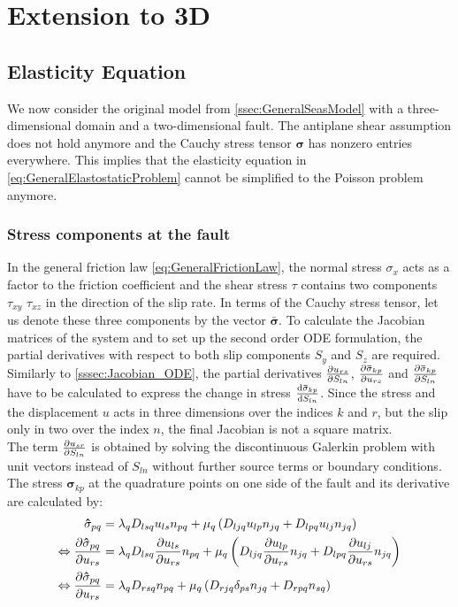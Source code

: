 \chapter{Extension to 3D}
\section{Elasticity Equation}
We now consider the original model from \autoref{ssec:GeneralSeasModel} with a three-dimensional domain and a two-dimensional fault. The antiplane shear assumption does not hold anymore and the Cauchy stress tensor $\mathbf{\sigma}$ has nonzero entries everywhere. This implies that the elasticity equation in \autoref{eq:GeneralElastostaticProblem} cannot be simplified to the Poisson problem anymore. \\

\subsection{Stress components at the fault}
In the general friction law \ref{eq:GeneralFrictionLaw}, the normal stress $\sigma_x$ acts as a factor to the friction coefficient and the shear stress $\tau$ contains two components $\tau_{xy}$ $\tau_{xz}$ in the direction of the slip rate. In terms of the Cauchy stress tensor, let us denote these three components by the vector $\mathbf{\bar{\sigma}}$. To calculate the Jacobian matrices of the system and to set up the second order ODE formulation, the partial derivatives with respect to both slip components $S_y$ and $S_z$ are required. Similarly to \autoref{sssec:Jacobian_ODE}, the partial derivatives $\pdv{u_{rs}}{S_{ln}}$, $\pdv{\mathbf{\bar{\sigma}}_{kp}}{u_{rs}}$ and $\pdv{\mathbf{\bar{\sigma}}_{kp}}{S_{ln}}$ have to be calculated to express the change in stress $\dv{\mathbf{\bar{\sigma}}_{kp}}{S_{ln}}$. Since the stress and the displacement $u$ acts in three dimensions over the indices $k$ and $r$, but the slip only in two over the index $n$, the final Jacobian is not a square matrix. \\
The term $\pdv{u_{sr}}{S_{ln}}$ is obtained by solving the discontinuous Galerkin problem with unit vectors instead of $S_{ln}$ without further source terms or boundary conditions. The stress $\mathbf{\hat{\sigma}}_{kp}$ at the quadrature points on one side of the fault and its derivative are calculated by:
\begin{align}
	\mathbf{\hat{\sigma}}_{pq} &= \lambda_q D_{lsq} u_{ls} n_{pq} + \mu_q \left(D_{ljq} u_{lp} n_{jq} + D_{lpq} u_{lj} n_{jq} \right) \\ \Leftrightarrow
	\pdv{\mathbf{\hat{\sigma}}_{pq}}{u_{rs}} &= \lambda_q D_{lsq} \pdv{u_{ls}}{u_{rs}} n_{pq} + \mu_q \left(D_{ljq} \pdv{u_{lp}}{u_{rs}} n_{jq} + D_{lpq} \pdv{u_{lj}}{u_{rs}} n_{jq} \right) \\ \Leftrightarrow
	\pdv{\mathbf{\hat{\sigma}}_{pq}}{u_{rs}} &= \lambda_q D_{rsq}  n_{pq} + \mu_q \left(D_{rjq} \delta_{ps} n_{jq} + D_{rpq} n_{sq} \right) \label{eq:intermediateStep7.3}
\end{align}

